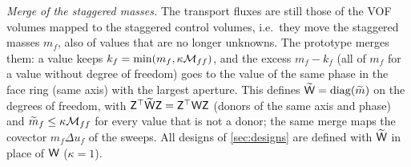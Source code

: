 \emph{Merge of the staggered masses.}  The transport fluxes are still those of the VOF volumes
mapped to the staggered control volumes, i.e.\ they move the staggered masses $m_f$, also of
values that are no longer unknowns.  The prototype merges them: a value keeps
$k_f=\min(m_f,\kappa\mathcal M_{ff})$, and the excess $m_f-k_f$ (all of $m_f$ for a value without
degree of freedom) goes to the value of the same phase in the face ring (same axis) with the
largest aperture.  This defines $\widetilde{\mathsf W}=\operatorname{diag}(\widetilde m)$ on the degrees of
freedom, with $\mathsf Z^\top\widetilde{\mathsf W}\mathsf Z=\mathsf Z^\top\mathsf W\mathsf Z$ (donors of the same axis and phase) and
$\widetilde m_f\le\kappa\mathcal M_{ff}$ for every value that is not a donor; the same merge maps the
covector $m_f\Delta u_f$ of the sweeps.  All designs of \cref{sec:designs} are defined with
$\widetilde{\mathsf W}$ in place of $\mathsf W$ ($\kappa=1$).

